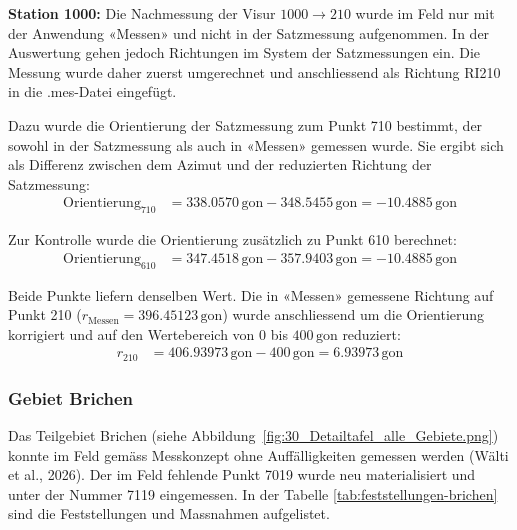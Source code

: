 \textbf{Station 1000:} Die Nachmessung der Visur $1000 \rightarrow 210$ wurde im Feld
nur mit der Anwendung «Messen» und nicht in der Satzmessung aufgenommen. In der
Auswertung gehen jedoch Richtungen im System der Satzmessungen ein. Die Messung wurde
daher zuerst umgerechnet und anschliessend als Richtung RI210 in die .mes-Datei eingefügt.

Dazu wurde die Orientierung der Satzmessung zum Punkt 710 bestimmt, der sowohl in der
Satzmessung als auch in «Messen» gemessen wurde. Sie ergibt sich als Differenz zwischen
dem Azimut und der reduzierten Richtung der Satzmessung:
\begin{align*}
    \operatorname{Orientierung}_{710} &= 338.0570\,\mathrm{gon} - 348.5455\,\mathrm{gon} = -10.4885\,\mathrm{gon}
\end{align*}

Zur Kontrolle wurde die Orientierung zusätzlich zu Punkt 610 berechnet:
\begin{align*}
    \operatorname{Orientierung}_{610} &= 347.4518\,\mathrm{gon} - 357.9403\,\mathrm{gon} = -10.4885\,\mathrm{gon}
\end{align*}

Beide Punkte liefern denselben Wert. Die in «Messen» gemessene Richtung auf Punkt 210
($r_{\text{Messen}} = 396.45123\,\mathrm{gon}$) wurde anschliessend um die Orientierung
korrigiert und auf den Wertebereich von $0$ bis $400\,\mathrm{gon}$ reduziert:
\begin{align*}
    r_{210} &= 406.93973\,\mathrm{gon} - 400\,\mathrm{gon} = 6.93973\,\mathrm{gon}
\end{align*}

\subsubsection{Gebiet Brichen}
\label{sec:gebiet-brichen}
Das Teilgebiet Brichen (siehe Abbildung~\ref{fig:30_Detailtafel_alle_Gebiete.png}) konnte im Feld gemäss Messkonzept ohne
Auffälligkeiten gemessen werden (Wälti et al., 2026).
Der im Feld fehlende Punkt 7019 wurde neu materialisiert und unter der
Nummer 7119 eingemessen. In der Tabelle \ref{tab:feststellungen-brichen} sind die
Feststellungen und Massnahmen aufgelistet.

